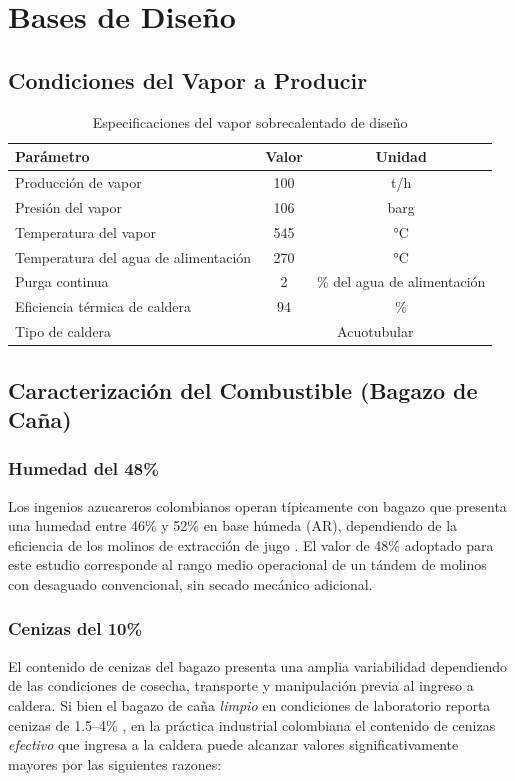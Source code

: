 \section{Bases de Diseño}

\subsection{Condiciones del Vapor a Producir}
\begin{table}[H]
	\centering
	\caption{Especificaciones del vapor sobrecalentado de diseño}
	\label{tab:steam_specs}
	\begin{tabular}{@{}lcc@{}}
		\toprule
		\textbf{Parámetro} & \textbf{Valor} & \textbf{Unidad} \\
		\midrule
		Producción de vapor & 100 & t/h \\
		Presión del vapor & 106 & barg \\
		Temperatura del vapor & 545 & \si{\celsius} \\
		Temperatura del agua de alimentación & 270 & \si{\celsius} \\
		Purga continua & 2 & \% del agua de alimentación \\
		Eficiencia térmica de caldera & 94 & \% \\
		Tipo de caldera & \multicolumn{2}{c}{Acuotubular} \\
		\bottomrule
	\end{tabular}
\end{table}

\subsection{Caracterización del Combustible (Bagazo de Caña)}

\subsubsection{Humedad del 48\%}
Los ingenios azucareros colombianos operan típicamente con bagazo que presenta una humedad entre 46\% y 52\% en base húmeda (AR), dependiendo de la eficiencia de los molinos de extracción de jugo \cite{hugot1986}. El valor de 48\% adoptado para este estudio corresponde al rango medio operacional de un tándem de molinos con desaguado convencional, sin secado mecánico adicional.

\subsubsection{Cenizas del 10\%}
El contenido de cenizas del bagazo presenta una amplia variabilidad dependiendo de las condiciones de cosecha, transporte y manipulación previa al ingreso a caldera. Si bien el bagazo de caña \textit{limpio} en condiciones de laboratorio reporta cenizas de 1.5--4\% \cite{scielo_bagasse}, en la práctica industrial colombiana el contenido de cenizas \textit{efectivo} que ingresa a la caldera puede alcanzar valores significativamente mayores por las siguientes razones:

